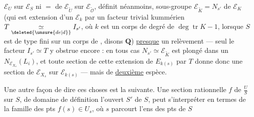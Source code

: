 $\mathcal E_U$ sur $\mathcal E_S$ ni $=$ de $\mathcal E_{\widetilde U}$ sur $\mathcal E_{\widetilde{\mathcal O}}$, définit néanmoins,   sous-groupe $\mathcal E_{\widetilde K}=N_{s'}$ de $\mathcal E_K$ (qui est extension d'un $\mathcal E_k$ par un facteur trivial kummérien $T\underset{\deleted{\unsure{de|d}}}{\simeq}I_{s'}$, où $k$ est un corps de degré de  $\deg\operatorname{tr}K-1$, lorsque $S$ est de type fini sur un corps de , disons $\mathbf Q$) \uline{presque} un relèvement --- seul le facteur $I_{s'}\simeq T$ y obstrue encore : en tous cas $N_{s'}\simeq\mathcal E_{\widetilde K}$ est plongé dans un $N_{\mathcal E_{X_s}}(L_i)$, et toute section de cette extension de $E_{k(s)}$ par $T$ donne donc une section de $\mathcal E_{X_s}$ sur $\mathcal E_{k(s)}$ --- mais de \uline{deuxième} espèce.

Une  autre façon de dire ces choses est la suivante. Une section rationnelle $f$ de $\frac{U}{S}$ sur $S$, de domaine de définition l'ouvert $S'$ de $S$,  peut s'interpréter en termes de la famille des pts $f(s)\in U_s$, où $s$ parcourt l'ens des pts de $S$
